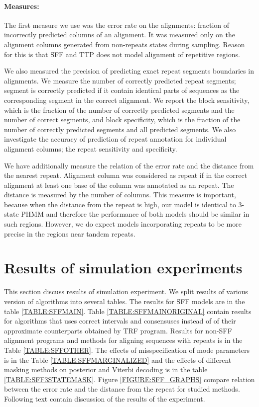 \paragraph{Measures:} The first measure we use was the error rate on the
alignments: fraction of incorrectly predicted columns of an alignment. It was
measured only on the alignment columns generated from non-repeats states during
sampling. Reason for this is that SFF and TTP does not model alignment of
repetitive regions.

We also measured the precision of predicting exact repeat segments boundaries
in alignments. We measure the number of correctly predicted repeat segments;
segment is correctly predicted if it contain identical parts of sequences as
the corresponding segment in the correct alignment. We report the block
sensitivity, which is the fraction of the number of correctly predicted
segments and the number of correct segments, and block specificity, which is
the fraction of the number of correctly predicted segments and all predicted
segments. We also investigate the accuracy of prediction of repeat annotation
for individual alignment columns; the repeat sensitivity and specificity.

We have additionally measure the relation of the error rate and the distance
from the nearest repeat. Alignment column was considered as repeat if in the
correct alignment at least one base of the column was annotated as an repeat.
The distance is measured by the number of columns. This measure is important,
because when the distance from the repeat is high, our model is identical to
3-state PHMM and therefore the performance of both models should be similar in
such regions.  However, we do expect models incorporating repeats to be more
precise in the regions near tandem repeats.

\section{Results of simulation experiments}\label{SECTION:REPSIMRESULTS}

This section discuss results of simulation experiment. We split results of
various version of algorithms into several tables. The results for SFF models
are in the table \ref{TABLE:SFFMAIN}. Table \ref{TABLE:SFFMAINORIGINAL} contain
results for algorithms that uses correct intervals and consensuses instead of
of their approximate counterparts obtained by TRF program. Results for non-SFF
alignment programs and methods for aligning sequences with repeats is in the
Table \ref{TABLE:SFFOTHER}. The effects of misspecification of mode parameters
is in the Table \ref{TABLE:SFFMARGINALIZED} and the effects of different
masking methods on posterior and Viterbi decoding is in the table
\ref{TABLE:SFF3STATEMASK}. Figure \ref{FIGURE:SFF_GRAPHS} compare relation
between the error rate and the distance from the repeat for studied methods.
Following text contain discussion of the results of the experiment.

